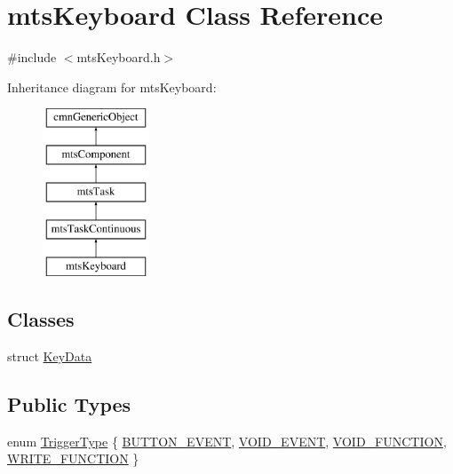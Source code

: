 \hypertarget{classmts_keyboard}{}\section{mts\+Keyboard Class Reference}
\label{classmts_keyboard}


{\ttfamily \#include $<$mts\+Keyboard.\+h$>$}

Inheritance diagram for mts\+Keyboard\+:\begin{figure}[H]
\begin{center}
\leavevmode
\includegraphics[height=5.000000cm]{d1/df6/classmts_keyboard}
\end{center}
\end{figure}
\subsection*{Classes}
\begin{DoxyCompactItemize}
\item 
struct \hyperlink{structmts_keyboard_1_1_key_data}{Key\+Data}
\end{DoxyCompactItemize}
\subsection*{Public Types}
\begin{DoxyCompactItemize}
\item 
enum \hyperlink{classmts_keyboard_a4a455c544287ea2a16f3353a5fe379c4}{Trigger\+Type} \{ \hyperlink{classmts_keyboard_a4a455c544287ea2a16f3353a5fe379c4a2005a59d8a3093caea39516bff3c1f68}{B\+U\+T\+T\+O\+N\+\_\+\+E\+V\+E\+N\+T}, 
\hyperlink{classmts_keyboard_a4a455c544287ea2a16f3353a5fe379c4af89c0f2b1fb07aa083081e2e6c37d07a}{V\+O\+I\+D\+\_\+\+E\+V\+E\+N\+T}, 
\hyperlink{classmts_keyboard_a4a455c544287ea2a16f3353a5fe379c4a7661678d0018e54f1aa6e9a7d4dabb2a}{V\+O\+I\+D\+\_\+\+F\+U\+N\+C\+T\+I\+O\+N}, 
\hyperlink{classmts_keyboard_a4a455c544287ea2a16f3353a5fe379c4acf111fcd06625697068ed28e8f5482ec}{W\+R\+I\+T\+E\+\_\+\+F\+U\+N\+C\+T\+I\+O\+N}
 \}
\end{DoxyCompactItemize}
